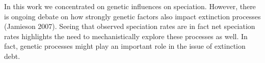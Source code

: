 \documentclass[a4paper]{scrartcl}
\begin{document}
In this work we concentrated on genetic influences on speciation.
However, there is ongoing debate on how strongly genetic factors also impact extinction processes (Jamieson 2007).
Seeing that observed speciation rates are in fact net speciation rates highlights the need to mechanistically explore
these processes as well.
In fact, genetic processes might play an important role in the issue of extinction debt. %

\printbibliography
\end{document}
